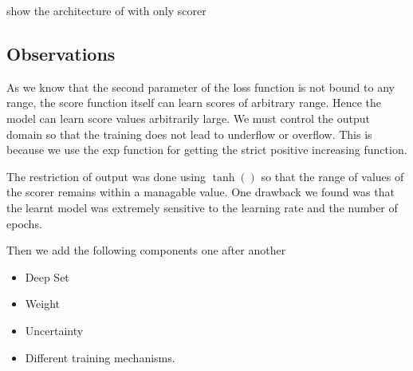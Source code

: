\documentclass[11pt]{report}
\begin{document}

show the architecture of with only scorer


\subsection{Observations}
As we know that the second parameter of the loss function is not bound to any range, 
the score function itself can learn scores of arbitrary range.
Hence the model can learn score values arbitrarily large.
We must control the output domain so that the training does not lead to underflow or overflow.
This is because we use the exp function for getting the strict positive increasing function.

The restriction of output was done using $\tanh()$ so that the range of values of the scorer remains within a managable value.
One drawback we found was that the learnt model was extremely sensitive to the learning rate and the number of epochs.

  
  Then we add the following components one after another

\begin{itemize}
\item Deep Set
\item Weight
\item Uncertainty
\item Different training mechanisms.
\end{itemize}
\end{document}
